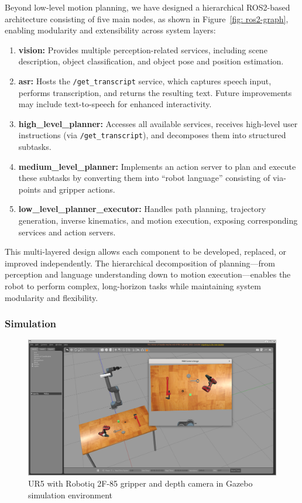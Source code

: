 \documentclass[12pt]{extarticle}
\begin{document}
Beyond low-level motion planning, we have designed a hierarchical ROS2-based architecture consisting of five main nodes, as shown in Figure~\ref{fig: ros2-graph}, enabling modularity and extensibility across system layers:
\begin{enumerate}
    \item \textbf{vision:} Provides multiple perception-related services, including scene description, object classification, and object pose and position estimation.
    \item \textbf{asr:} Hosts the \texttt{/get\_transcript} service, which captures speech input, performs transcription, and returns the resulting text. Future improvements may include text-to-speech for enhanced interactivity.
    \item \textbf{high\_level\_planner:} Accesses all available services, receives high-level user instructions (via \texttt{/get\_transcript}), and decomposes them into structured subtasks.
    \item \textbf{medium\_level\_planner:} Implements an action server to plan and execute these subtasks by converting them into “robot language” consisting of via-points and gripper actions.
    \item \textbf{low\_level\_planner\_executor:} Handles path planning, trajectory generation, inverse kinematics, and motion execution, exposing corresponding services and action servers.
\end{enumerate}

This multi-layered design allows each component to be developed, replaced, or improved independently. The hierarchical decomposition of planning—from perception and language understanding down to motion execution—enables the robot to perform complex, long-horizon tasks while maintaining system modularity and flexibility.



\subsubsection{Simulation}

\begin{figure}[h]
    \centering
    \includegraphics[width=\linewidth]{images/gazebo_setup.png}
    \caption{UR5 with Robotiq 2F-85 gripper and depth camera in Gazebo simulation environment}
    \label{fig: gazebo-setup}
\end{figure}
\end{document}
